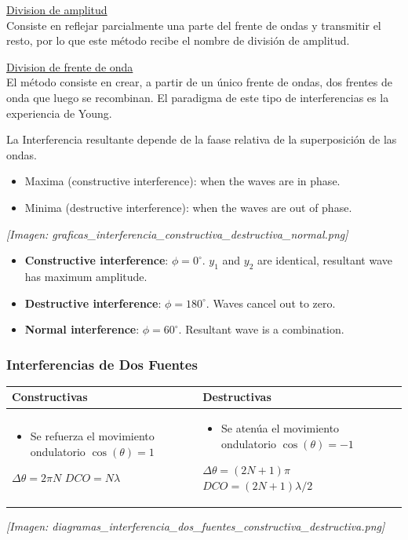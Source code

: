 \documentclass[12pt]{article}
\begin{document}
	\underline{Division de amplitud}\\
	Consiste en reflejar parcialmente una parte del frente de ondas y transmitir el resto, por lo que este método recibe el nombre de división de amplitud.
	
	\underline{Division de frente de onda}\\
	El método consiste en crear, a partir de un único frente de ondas, dos frentes de onda que luego se recombinan. El paradigma de este tipo de interferencias es la experiencia de Young.
	
	La Interferencia resultante depende de la faase relativa de la superposición de las ondas.
	\begin{itemize}
		\item Maxima (constructive interference): when the waves are in phase.
		\item Minima (destructive interference): when the waves are out of phase.
	\end{itemize}
	
	\textit{[Imagen: graficas\_interferencia\_constructiva\_destructiva\_normal.png]}
	\begin{itemize}
		\item \textbf{Constructive interference}: $\phi = 0^\circ$. $y_1$ and $y_2$ are identical, resultant wave has maximum amplitude.
		\item \textbf{Destructive interference}: $\phi = 180^\circ$. Waves cancel out to zero.
		\item \textbf{Normal interference}: $\phi = 60^\circ$. Resultant wave is a combination.
	\end{itemize}
	
	\subsubsection*{Interferencias de Dos Fuentes}
	\begin{center}
		\begin{tabular}{|p{}|p{}|}
			\hline
			\textbf{Constructivas} & \textbf{Destructivas} \\
			\hline
			\begin{itemize}
				\item Se refuerza el movimiento ondulatorio $\cos(\theta) = 1$
			\end{itemize}
			$\Delta\theta = 2\pi N$ \newline
			$DCO = N\lambda$ &
			\begin{itemize}
				\item Se atenúa el movimiento ondulatorio $\cos(\theta) = -1$
			\end{itemize}
			$\Delta\theta = (2N+1)\pi$ \newline
			$DCO = (2N+1)\lambda/2$ \\
			\hline
		\end{tabular}
	\end{center}
	\textit{[Imagen: diagramas\_interferencia\_dos\_fuentes\_constructiva\_destructiva.png]}
	
\end{document}
